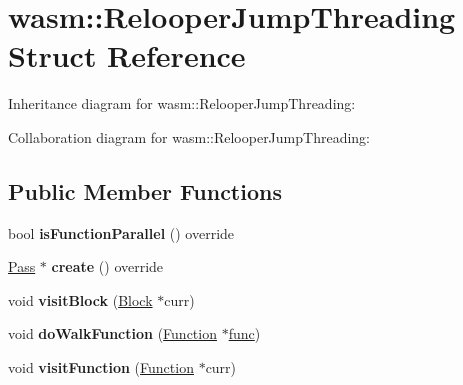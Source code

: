 \hypertarget{structwasm_1_1_relooper_jump_threading}{}\section{wasm\+:\+:Relooper\+Jump\+Threading Struct Reference}
\label{structwasm_1_1_relooper_jump_threading}


Inheritance diagram for wasm\+:\+:Relooper\+Jump\+Threading\+:


Collaboration diagram for wasm\+:\+:Relooper\+Jump\+Threading\+:
\subsection*{Public Member Functions}
\begin{DoxyCompactItemize}
\item 
\mbox{\label{structwasm_1_1_relooper_jump_threading_a435d1afc8add9892954c887dc65f720d}} 
bool {\bfseries is\+Function\+Parallel} () override
\item 
\mbox{\label{structwasm_1_1_relooper_jump_threading_aa48a11721d32cea495dbb6c2e072c7f3}} 
\mbox{\hyperlink{classwasm_1_1_pass}{Pass}} $\ast$ {\bfseries create} () override
\item 
\mbox{\label{structwasm_1_1_relooper_jump_threading_aaba94949b685634b4fa9acb67662cd16}} 
void {\bfseries visit\+Block} (\mbox{\hyperlink{classwasm_1_1_block}{Block}} $\ast$curr)
\item 
\mbox{\label{structwasm_1_1_relooper_jump_threading_adf21005bb1dd1166d69dfa58b4036152}} 
void {\bfseries do\+Walk\+Function} (\mbox{\hyperlink{classwasm_1_1_function}{Function}} $\ast$\mbox{\hyperlink{structfunc}{func}})
\item 
\mbox{\label{structwasm_1_1_relooper_jump_threading_af767c09918175c7467db56b0f9f5ebed}} 
void {\bfseries visit\+Function} (\mbox{\hyperlink{classwasm_1_1_function}{Function}} $\ast$curr)
\end{DoxyCompactItemize}
